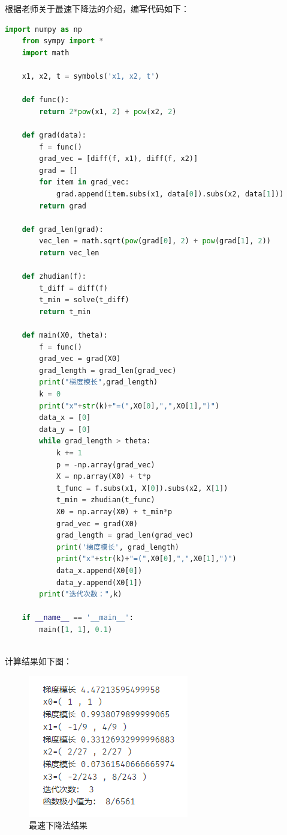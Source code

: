 \documentclass[12pt,a4paper]{article}
\begin{document}
根据老师关于最速下降法的介绍，编写代码如下：
\begin{lstlisting}[language={python}]
    import numpy as np
    from sympy import *
    import math

    x1, x2, t = symbols('x1, x2, t')
    
    def func():
        return 2*pow(x1, 2) + pow(x2, 2)
    
    def grad(data):
        f = func()
        grad_vec = [diff(f, x1), diff(f, x2)]
        grad = []
        for item in grad_vec:
            grad.append(item.subs(x1, data[0]).subs(x2, data[1]))
        return grad
    
    def grad_len(grad):
        vec_len = math.sqrt(pow(grad[0], 2) + pow(grad[1], 2))
        return vec_len
    
    def zhudian(f):
        t_diff = diff(f)
        t_min = solve(t_diff)
        return t_min
    
    def main(X0, theta):
        f = func()
        grad_vec = grad(X0)
        grad_length = grad_len(grad_vec)
        print("梯度模长",grad_length)
        k = 0
        print("x"+str(k)+"=(",X0[0],",",X0[1],")")
        data_x = [0]
        data_y = [0]
        while grad_length > theta:
            k += 1
            p = -np.array(grad_vec)
            X = np.array(X0) + t*p
            t_func = f.subs(x1, X[0]).subs(x2, X[1])
            t_min = zhudian(t_func)
            X0 = np.array(X0) + t_min*p
            grad_vec = grad(X0)
            grad_length = grad_len(grad_vec)
            print('梯度模长', grad_length)
            print("x"+str(k)+"=(",X0[0],",",X0[1],")")
            data_x.append(X0[0])
            data_y.append(X0[1])
        print("迭代次数：",k)
        
    if __name__ == '__main__':
        main([1, 1], 0.1)

\end{lstlisting}
~\\
计算结果如下图：
\begin{figure}
    \centering
    \includegraphics[scale=0.8]{steepest.png}
    \caption{最速下降法结果}
    \label{fig:1}
\end{figure}
\end{document}
